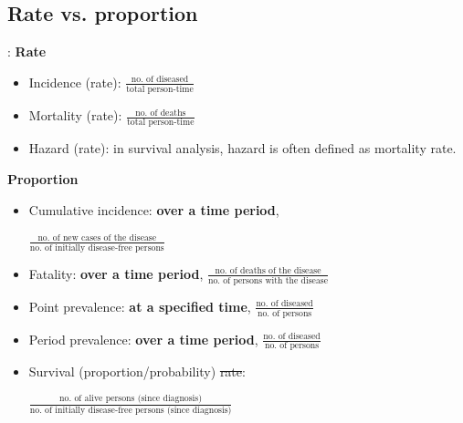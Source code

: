 \subsection{Rate vs. proportion}
\begin{frame}{\secname: \subsecname}
\textbf{Rate}
\begin{itemize}
	  \item<2|handout:2-> Incidence (rate): $\frac{\text{no. of diseased}}{\text{total person-time}}$
	  \item<3|handout:3-> Mortality (rate): $\frac{\text{no. of deaths}}{\text{total person-time}}$
	  \item<4|handout:4-> Hazard (rate): in survival analysis, hazard is often defined as mortality rate.
	  \end{itemize}
\textbf{Proportion}
	\begin{itemize}
	\item<5|handout:5-> Cumulative incidence: \textbf{over a time period}, \begin{small}
 	$\frac{\text{no. of new cases of the disease}}{\text{no. of initially disease-free persons}}$
 \end{small}
	\item<6|handout:6-> Fatality: \textbf{over a time period}, $\frac{\text{no. of deaths of the disease}}{\text{no. of persons with the disease}}$
	\item<7|handout:7-> Point prevalence: \textbf{at a specified time}, $\frac{\text{no. of diseased}}{\text{no. of persons}}$
	\item<7|handout:7-> Period prevalence: \textbf{over a time period}, $\frac{\text{no. of diseased}}{\text{no. of persons}}$
	\item<8|handout:8-> Survival (proportion/probability) \st{rate}: \begin{center}
 	$\frac{\text{no. of alive persons (since diagnosis)}}{\text{no. of initially disease-free persons (since diagnosis)}}$
 \end{center}
	\end{itemize}

\end{frame}
